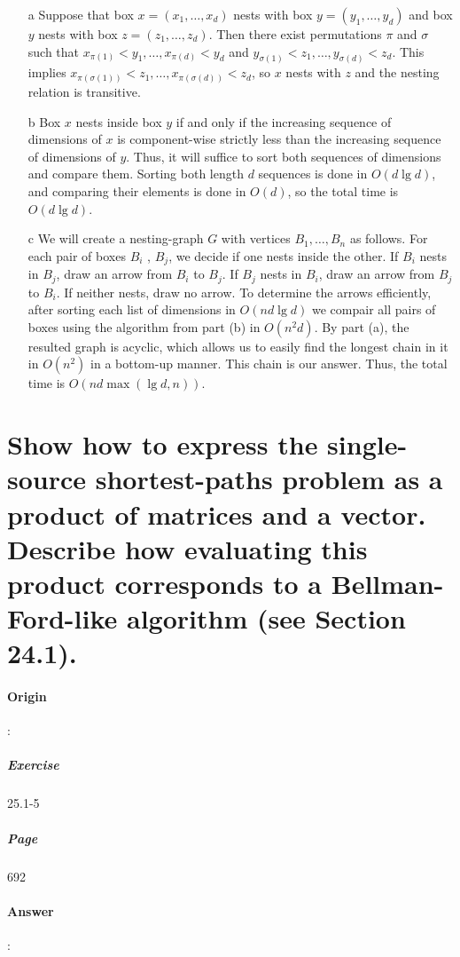 \documentclass{article}
\begin{document}
\begin{enumerate}
  \item[a] Suppose that box $x = (x_1, \dots, x_d)$ nests with box $y = (y_1, \dots, y_d)$ and box $y$ nests with box $z = (z_1, \dots, z_d)$. Then there exist permutations $\pi$ and $\sigma$ such that $x_{\pi(1)} < y_1, \dots, x_{\pi(d)} < y_d$ and $y_{\sigma(1)} < z_1, \dots, y_{\sigma(d)} < z_d$. This implies $x_{\pi(\sigma(1))} < z_1, \dots, x_{\pi(\sigma(d))} < z_d$, so $x$ nests with $z$ and the nesting relation is transitive.
  \item[b] Box $x$ nests inside box $y$ if and only if the increasing sequence of dimensions of $x$ is component-wise strictly less than the increasing sequence of dimensions of $y$. Thus, it will suffice to sort both sequences of dimensions and compare them. Sorting both length $d$ sequences is done in $O(d\lg d)$, and comparing their elements is done in $O(d)$, so the total time is $O(d\lg d)$.
  \item[c] We will create a nesting-graph $G$ with vertices $B_1, \dots, B_n$ as follows. For each pair of boxes $B_i$ , $B_j$, we decide if one nests inside the other. If $B_i$ nests in $B_j$, draw an arrow from $B_i$ to $B_j$. If $B_j$ nests in $B_i$, draw an arrow from $B_j$ to $B_i$. If neither nests, draw no arrow. To determine the arrows efficiently, after sorting each list of dimensions in $O(nd\lg d)$ we compair all pairs of boxes using the algorithm from part (b) in $O(n^2 d)$. By part (a), the resulted graph is acyclic, which allows us to easily find the longest chain in it in $O(n^2)$ in a bottom-up manner. This chain is our answer. Thus, the total time is $O(nd\max(\lg d, n))$.
\end{enumerate}

\section{Show how to express the single-source shortest-paths problem as a product of matrices and a vector. Describe how evaluating this product corresponds to a Bellman-Ford-like algorithm (see Section 24.1).}

\paragraph{Origin}:
  \subparagraph{Exercise}25.1-5
  \subparagraph{Page}692
\paragraph{Answer}:
 
\end{document}
